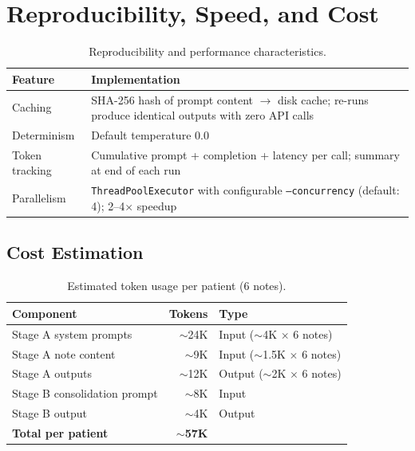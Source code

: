 \documentclass[11pt, a4paper]{article}
\begin{document}
\section{Reproducibility, Speed, and Cost}

\begin{table}[H]
\centering
\caption{Reproducibility and performance characteristics.}
\begin{tabular}{lp{10cm}}
\toprule
\textbf{Feature} & \textbf{Implementation} \\
\midrule
Caching & SHA-256 hash of prompt content $\rightarrow$ disk cache; re-runs produce identical outputs with zero API calls \\
Determinism & Default temperature 0.0 \\
Token tracking & Cumulative prompt + completion + latency per call; summary at end of each run \\
Parallelism & \texttt{ThreadPoolExecutor} with configurable \texttt{--concurrency} (default: 4); 2--4$\times$ speedup \\
\bottomrule
\end{tabular}
\end{table}

\subsection{Cost Estimation}

\begin{table}[H]
\centering
\caption{Estimated token usage per patient (6 notes).}
\begin{tabular}{lrl}
\toprule
\textbf{Component} & \textbf{Tokens} & \textbf{Type} \\
\midrule
Stage A system prompts & $\sim$24K & Input ($\sim$4K $\times$ 6 notes) \\
Stage A note content & $\sim$9K & Input ($\sim$1.5K $\times$ 6 notes) \\
Stage A outputs & $\sim$12K & Output ($\sim$2K $\times$ 6 notes) \\
Stage B consolidation prompt & $\sim$8K & Input \\
Stage B output & $\sim$4K & Output \\
\midrule
\textbf{Total per patient} & $\sim$\textbf{57K} & \\
\bottomrule
\end{tabular}
\end{table}
\end{document}
